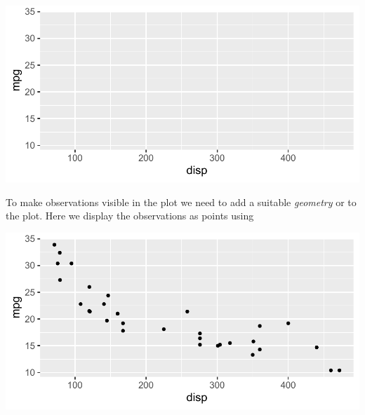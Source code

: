 \documentclass[krantz2]{krantz}\usepackage{knitr}
\begin{document}
\begin{knitrout}\footnotesize
{}\color{fgcolor}\begin{kframe}
\begin{alltt}
\hlstd{(} 
       \hlstd{(}   
\end{alltt}
\end{kframe}

{\centering \includegraphics[width=.7\textwidth]{figure/pos-ggplot-basics-03-1} 

}


\end{knitrout}

To make observations visible in the plot we need to add a suitable \emph{geometry} or  to the plot. Here we display the observations as points using 

\begin{knitrout}\footnotesize
{}\color{fgcolor}\begin{kframe}
\begin{alltt}
\hlstd{(} 
       \hlstd{(}    \hlopt{+}
  \hlstd{()}
\end{alltt}
\end{kframe}

{\centering \includegraphics[width=.7\textwidth]{figure/pos-ggplot-basics-04-1} 

}


\end{knitrout}
\end{document}
